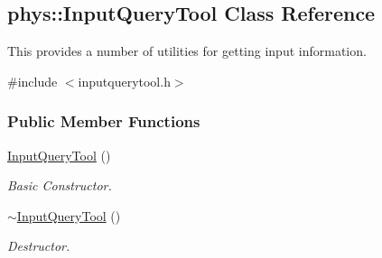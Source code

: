 \hypertarget{classphys_1_1InputQueryTool}{
\subsection{phys::InputQueryTool Class Reference}
\label{classphys_1_1InputQueryTool}
}


This provides a number of utilities for getting input information.  




{\ttfamily \#include $<$inputquerytool.h$>$}

\subsubsection*{Public Member Functions}
\begin{DoxyCompactItemize}
\item 
\hyperlink{classphys_1_1InputQueryTool_a10a997ec2e072d31808c794542c0516f}{InputQueryTool} ()
\begin{DoxyCompactList}\small\item\em Basic Constructor. \item\end{DoxyCompactList}\item 
\hyperlink{classphys_1_1InputQueryTool_a6a37616800928b691932045ba34759b8}{$\sim$InputQueryTool} ()
\begin{DoxyCompactList}\small\item\em Destructor. \item\end{DoxyCompactList}\end{DoxyCompactItemize}
